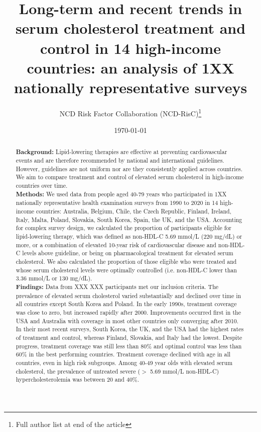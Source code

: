 \documentclass[12pt]{article}
\begin{document}
\begin{titlepage}
\title{Long-term and recent trends in serum cholesterol treatment and control in 14 high-income countries: an analysis of 1XX nationally representative surveys}
\author{NCD Risk Factor Collaboration (NCD-RisC)\thanks{Full author list at end of the article}}
\date{\today}
\maketitle

\end{titlepage}
\emptythanks
\clearpage
\begin{abstract}
    \noindent \textbf{Background:} Lipid-lowering therapies are effective at preventing cardiovascular events and are therefore recommended by national and international guidelines. However, guidelines are not uniform nor are they consistently applied across countries. We aim to compare treatment and control of elevated serum cholesterol in high-income countries over time.
    \vspace{0.5em} \\
    \noindent \textbf{Methods:} We used data from people aged 40-79 years who participated in 1XX nationally representative health examination surveys from 1990 to 2020 in 14 high-income countries: Australia, Belgium, Chile, the Czech Republic, Finland, Ireland, Italy, Malta, Poland, Slovakia, South Korea, Spain, the UK, and the USA. Accounting for complex survey design, we calculated the proportion of participants eligible for lipid-lowering therapy, which was defined as non-HDL-C 5.69 mmol/L (220 mg/dL) or more, or a combination of elevated 10-year risk of cardiovascular disease and non-HDL-C levels above guideline, or being on pharmacological treatment for elevated serum cholesterol. We also calculated the proportion of those eligible who were treated and whose serum cholesterol levels were optimally controlled (i.e. non-HDL-C lower than 3.36 mmol/L or 130 mg/dL).
    \vspace{0.5em} \\
    \noindent \textbf{Findings:} Data from XXX XXX participants met our inclusion criteria. The prevalence of elevated serum cholesterol varied substantially and declined over time in all countries except South Korea and Poland. In the early 1990s, treatment coverage was close to zero, but increased rapidly after 2000. Improvements occurred first in the USA and Australia with coverage in most other countries only converging after 2010. In their most recent surveys, South Korea, the UK, and the USA had the highest rates of treatment and control, whereas Finland, Slovakia, and Italy had the lowest. Despite progress, treatment coverage was still less than 80\% and optimal control was less than 60\% in the best performing countries. Treatment coverage declined with age in all countries, even in high risk subgroups. Among 40-49 year olds with elevated serum cholesterol, the prevalence of untreated severe ($>$ 5.69 mmol/L non-HDL-C) hypercholesterolemia was between 20 and 40\%.

\end{abstract}
\end{document}
